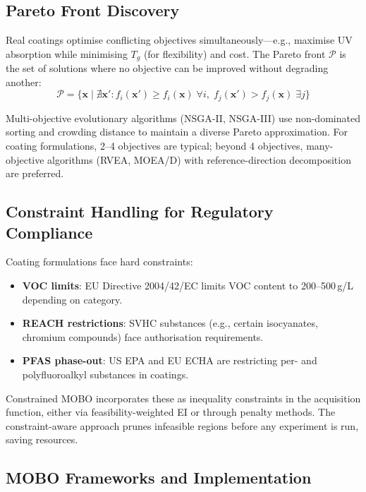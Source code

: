 \documentclass[11pt,a4paper]{article}
\begin{document}
\subsection{Pareto Front Discovery}

Real coatings optimise conflicting objectives simultaneously---e.g., maximise UV absorption while minimising $T_g$ (for flexibility) and cost.
The Pareto front $\mathcal{P}$ is the set of solutions where no objective can be improved without degrading another:
\begin{equation}
\mathcal{P} = \{ \mathbf{x} \mid \nexists \mathbf{x}' : f_i(\mathbf{x}') \geq f_i(\mathbf{x}) \;\forall i, \; f_j(\mathbf{x}') > f_j(\mathbf{x}) \;\exists j \}
\end{equation}

Multi-objective evolutionary algorithms (NSGA-II, NSGA-III) use non-dominated sorting and crowding distance to maintain a diverse Pareto approximation.
For coating formulations, 2--4 objectives are typical; beyond 4 objectives, many-objective algorithms (RVEA, MOEA/D) with reference-direction decomposition are preferred.

\subsection{Constraint Handling for Regulatory Compliance}

Coating formulations face hard constraints:
\begin{itemize}[nosep]
  \item \textbf{VOC limits}: EU Directive 2004/42/EC limits VOC content to 200--500\,g/L depending on category.
  \item \textbf{REACH restrictions}: SVHC substances (e.g., certain isocyanates, chromium compounds) face authorisation requirements.
  \item \textbf{PFAS phase-out}: US EPA and EU ECHA are restricting per- and polyfluoroalkyl substances in coatings.
\end{itemize}
Constrained MOBO incorporates these as inequality constraints in the acquisition function, either via feasibility-weighted EI or through penalty methods.
The constraint-aware approach prunes infeasible regions before any experiment is run, saving resources.

\subsection{MOBO Frameworks and Implementation}
\end{document}
